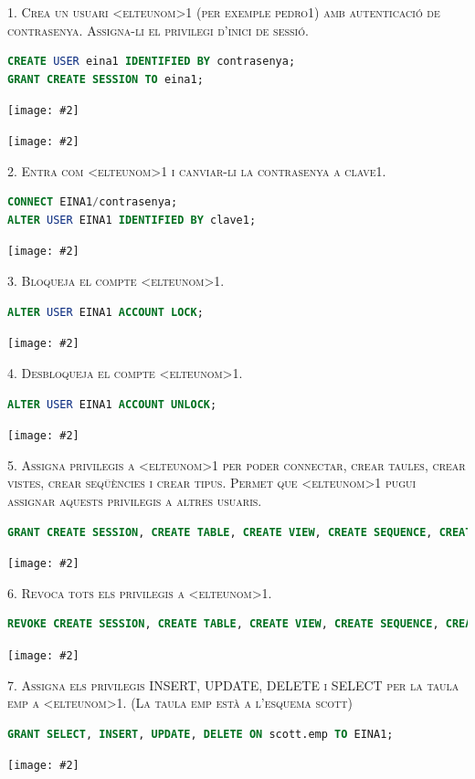 \documentclass[a4paper,12pt]{article}
\newcommand{\mygraphic}[2][width=\textwidth]{\begin{center}
		\centering\texttt{[image: \#2]}\par
\end{center}}
\begin{document}


\textsc{1. Crea un usuari <elteunom>1 (per exemple pedro1) amb autenticació de contrasenya. Assigna-li el privilegi d'inici de sessió.}

\begin{lstlisting}[language=SQL]
CREATE USER eina1 IDENTIFIED BY contrasenya;
GRANT CREATE SESSION TO eina1;
\end{lstlisting}
\mygraphic{imatges/1a.png}
\mygraphic{imatges/1b.png}

\newpage
\textsc{2. Entra com <elteunom>1 i canviar-li la contrasenya a clave1.}
\begin{lstlisting}[language=SQL]
CONNECT EINA1/contrasenya;
ALTER USER EINA1 IDENTIFIED BY clave1;
\end{lstlisting}
\mygraphic{imatges/2.png}

\textsc{3. Bloqueja el compte <elteunom>1.}
\begin{lstlisting}[language=SQL]
ALTER USER EINA1 ACCOUNT LOCK;
\end{lstlisting}
\mygraphic{imatges/3.png}

\newpage
\textsc{4. Desbloqueja el compte <elteunom>1.}
\begin{lstlisting}[language=SQL]
ALTER USER EINA1 ACCOUNT UNLOCK;
\end{lstlisting}
\mygraphic{imatges/4.png}

\textsc{5. Assigna privilegis a <elteunom>1 per poder connectar, crear taules, crear vistes, crear seqüències i crear tipus. Permet que <elteunom>1 pugui assignar aquests privilegis a altres usuaris.}
\begin{lstlisting}[language=SQL]
GRANT CREATE SESSION, CREATE TABLE, CREATE VIEW, CREATE SEQUENCE, CREATE TYPE TO EINA1 WITH ADMIN OPTION;
\end{lstlisting}
\mygraphic{imatges/5.png}

\textsc{6. Revoca tots els privilegis a <elteunom>1.}
\begin{lstlisting}[language=SQL]
REVOKE CREATE SESSION, CREATE TABLE, CREATE VIEW, CREATE SEQUENCE, CREATE TYPE FROM EINA1;
\end{lstlisting}
\mygraphic{imatges/6.png}

\textsc{7. Assigna els privilegis INSERT, UPDATE, DELETE i SELECT per la taula emp a <elteunom>1. (La taula emp està a l'esquema scott)}
\begin{lstlisting}[language=SQL]
GRANT SELECT, INSERT, UPDATE, DELETE ON scott.emp TO EINA1;
\end{lstlisting}
\mygraphic{imatges/7.png}
\end{document}
